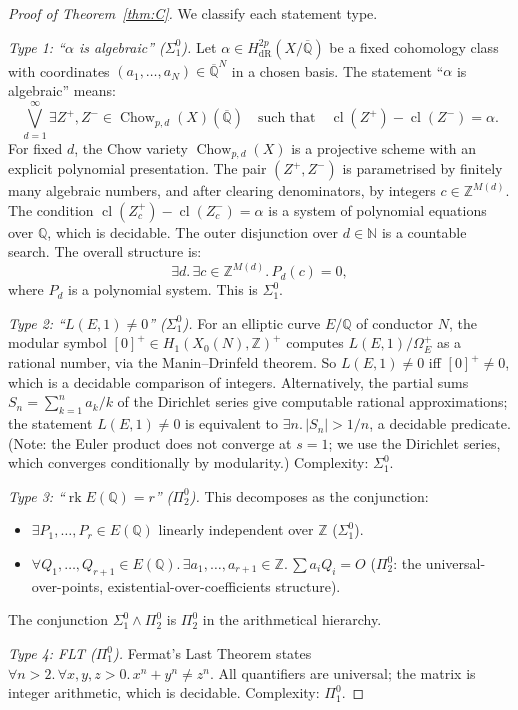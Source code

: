 \documentclass[11pt,a4paper]{article}
\theoremstyle{plain}
\theoremstyle{definition}
\newcommand{\Z}{\mathbb{Z}}
\newcommand{\Q}{\mathbb{Q}}
\newcommand{\N}{\mathbb{N}}
\DeclareMathOperator{\Chow}{Chow}
\DeclareMathOperator{\cl}{cl}
\DeclareMathOperator{\rk}{rk}
\begin{document}
\begin{proof}[Proof of Theorem~\ref{thm:C}]
We classify each statement type.

\emph{Type 1: ``$\alpha$ is algebraic'' ($\Sigma^0_1$).}  Let $\alpha \in H^{2p}_{\mathrm{dR}}(X/\overline{\Q})$ be a fixed cohomology class with coordinates $(a_1, \ldots, a_N) \in \overline{\Q}^N$ in a chosen basis.  The statement ``$\alpha$ is algebraic'' means:
\[
\bigvee_{d=1}^{\infty} \exists Z^+, Z^- \in \Chow_{p,d}(X)(\overline{\Q}) \quad\text{such that}\quad \cl(Z^+) - \cl(Z^-) = \alpha.
\]
For fixed $d$, the Chow variety $\Chow_{p,d}(X)$ is a projective scheme with an explicit polynomial presentation.  The pair $(Z^+, Z^-)$ is parametrised by finitely many algebraic numbers, and after clearing denominators, by integers $c \in \Z^{M(d)}$.  The condition $\cl(Z^+_c) - \cl(Z^-_c) = \alpha$ is a system of polynomial equations over $\Q$, which is decidable.  The outer disjunction over $d \in \N$ is a countable search.  The overall structure is:
\[
\exists d.\, \exists c \in \Z^{M(d)}.\, P_d(c) = 0,
\]
where $P_d$ is a polynomial system.  This is $\Sigma^0_1$.

\emph{Type 2: ``$L(E,1) \ne 0$'' ($\Sigma^0_1$).}  For an elliptic curve $E/\Q$ of conductor $N$, the modular symbol $[0]^+ \in H_1(X_0(N), \Z)^+$ computes $L(E,1)/\Omega^+_E$ as a rational number, via the Manin--Drinfeld theorem.  So $L(E,1) \ne 0$ iff $[0]^+ \ne 0$, which is a decidable comparison of integers.  Alternatively, the partial sums $S_n = \sum_{k=1}^{n} a_k/k$ of the Dirichlet series give computable rational approximations; the statement $L(E,1) \ne 0$ is equivalent to $\exists n.\, |S_n| > 1/n$, a decidable predicate.  (Note: the Euler product does not converge at $s = 1$; we use the Dirichlet series, which converges conditionally by modularity.)  Complexity: $\Sigma^0_1$.

\emph{Type 3: ``$\rk E(\Q) = r$'' ($\Pi^0_2$).}  This decomposes as the conjunction:
\begin{itemize}[nosep]
\item $\exists P_1, \ldots, P_r \in E(\Q)$ linearly independent over $\Z$ ($\Sigma^0_1$).
\item $\forall Q_1, \ldots, Q_{r+1} \in E(\Q).\, \exists a_1, \ldots, a_{r+1} \in \Z.\, \sum a_i Q_i = O$ ($\Pi^0_2$: the universal-over-points, existential-over-coefficients structure).
\end{itemize}
The conjunction $\Sigma^0_1 \land \Pi^0_2$ is $\Pi^0_2$ in the arithmetical hierarchy.

\emph{Type 4: FLT ($\Pi^0_1$).}  Fermat's Last Theorem states $\forall n > 2.\, \forall x, y, z > 0.\, x^n + y^n \ne z^n$.  All quantifiers are universal; the matrix is integer arithmetic, which is decidable.  Complexity: $\Pi^0_1$.
\end{proof}
\end{document}
